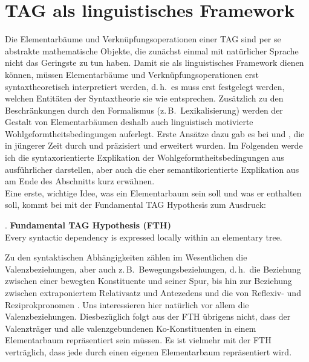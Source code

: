 \section{TAG als linguistisches Framework} \label{sec-tag-ling}

Die Elementarbäume und Verknüpfungsoperationen einer TAG sind per se abstrakte mathematische Objekte, die zunächst einmal mit natürlicher Sprache nicht das Geringste zu tun haben. Damit sie als linguistisches Framework dienen können, müssen Elementarbäume und Verknüpfungsoperationen erst syntaxtheoretisch interpretiert werden, d.\,h.\ es muss erst festgelegt werden, welchen Entitäten der Syntaxtheorie sie wie entsprechen. Zusätzlich zu den Beschränkungen durch den Formalismus (z.\,B.\ Lexikalisierung) werden der Gestalt von Elementarbäumen deshalb auch linguistisch motivierte Wohlgeformtheitsbedingungen auferlegt. Erste Ansätze dazu gab es bei \cite{Abeille:88,Abeille:88b} und \cite{Frank:92}, die in jüngerer Zeit durch \cite{Abeille:Rambow:00} und \cite{Frank:02} präzisiert und erweitert wurden. Im Folgenden werde ich die syntaxorientierte Explikation der Wohlgeformtheitsbedingungen aus \cite{Frank:02} ausführlicher darstellen, aber auch die eher semantikorientierte Explikation aus \cite{Abeille:Rambow:00} am Ende des Abschnitts kurz erwähnen.\\ 

 Eine erste, wichtige Idee, was ein Elementarbaum sein soll und was er enthalten soll, kommt bei \cite{Frank:02} mit der Fundamental TAG Hypothesis zum Ausdruck: 

\ex. {\bf Fundamental TAG Hypothesis (FTH)} \\
Every syntactic dependency is expressed locally within an elementary tree.
\citep[22]{Frank:02}

Zu den syntaktischen Abhängigkeiten zählen im Wesentlichen die Valenzbeziehungen, aber auch z.\,B.\ Bewegungsbeziehungen, d.\,h.\ die Beziehung zwischen einer bewegten Konstituente und seiner Spur, bis hin zur Beziehung zwischen extraponiertem Relativsatz und Antezedens \citep{Kroch:Joshi:87} und die  von Reflexiv- und Reziprokpronomen \citep{Ryant:Scheffler:06,Kallmeyer:Romero:07,Champollion:08}. Uns interessieren hier natürlich vor allem die Valenzbeziehungen. Diesbezüglich folgt aus der FTH übrigens nicht, dass der Valenzträger und alle valenzgebundenen Ko-Konstituenten in einem Elementarbaum repräsentiert sein müssen. Es ist vielmehr mit der FTH verträglich, dass jede  durch einen eigenen Elementarbaum repräsentiert wird. 

